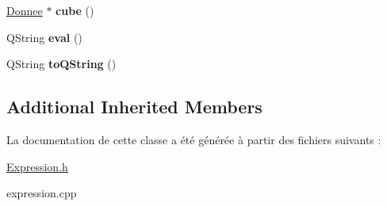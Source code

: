\begin{DoxyCompactItemize}
\item 
\hypertarget{class_expression_a7fdb59a63420b5b056fd96e6d5e83fcb}{\hyperlink{class_donnee}{Donnee} $\ast$ {\bfseries cube} ()}\label{class_expression_a7fdb59a63420b5b056fd96e6d5e83fcb}

\item 
\hypertarget{class_expression_a7312cb958b6366f84fb4e01f58cd2119}{Q\-String {\bfseries eval} ()}\label{class_expression_a7312cb958b6366f84fb4e01f58cd2119}

\item 
\hypertarget{class_expression_a4404792ff4997e7c06a3242062825f5c}{Q\-String {\bfseries to\-Q\-String} ()}\label{class_expression_a4404792ff4997e7c06a3242062825f5c}

\end{DoxyCompactItemize}
\subsection*{Additional Inherited Members}


La documentation de cette classe a été générée à partir des fichiers suivants \-:\begin{DoxyCompactItemize}
\item 
\hyperlink{_expression_8h}{Expression.\-h}\item 
expression.\-cpp\end{DoxyCompactItemize}
